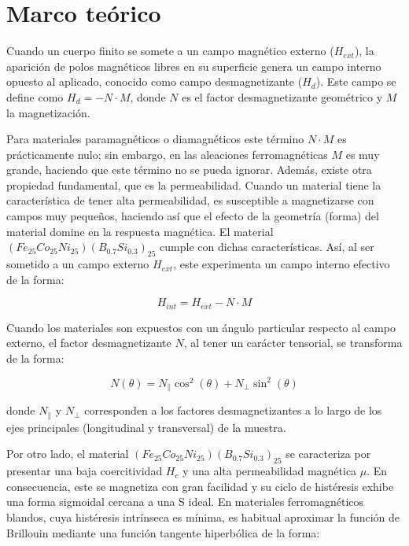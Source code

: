 


\section{Marco teórico}

Cuando un cuerpo finito se somete a un campo magnético externo ($H_{ext}$), la aparición de polos magnéticos libres en su superficie genera un campo interno opuesto al aplicado, conocido como campo desmagnetizante ($H_d$). Este campo se define como $H_d = -N \cdot M$, donde $N$ es el factor desmagnetizante geométrico y $M$ la magnetización.

Para materiales paramagnéticos o diamagnéticos este término $N \cdot M$ es prácticamente nulo; sin embargo, en las aleaciones ferromagnéticas $M$ es muy grande, haciendo que este término no se pueda ignorar. Además, existe otra propiedad fundamental, que es la permeabilidad. Cuando un material tiene la característica de tener alta permeabilidad, es susceptible a magnetizarse con campos muy pequeños, haciendo así que el efecto de la geometría (forma) del material domine en la respuesta magnética. El material $(Fe_{25}Co_{25}Ni_{25})(B_{0.7}Si_{0.3})_{25}$ cumple con dichas características. Así, al ser sometido a un campo externo $H_{ext}$, este experimenta un campo interno efectivo de la forma:

$$ H_{int} = H_{ext} - N \cdot M $$

Cuando los materiales son expuestos con un ángulo particular respecto al campo externo, el factor desmagnetizante $N$, al tener un carácter tensorial, se transforma de la forma:

$$ N(\theta) = N_{\parallel} \cos^2(\theta) + N_{\perp} \sin^2(\theta) $$

donde $N_{\parallel}$ y $N_{\perp}$ corresponden a los factores desmagnetizantes a lo largo de los ejes principales (longitudinal y transversal) de la muestra.

Por otro lado, el material $(Fe_{25}Co_{25}Ni_{25})(B_{0.7}Si_{0.3})_{25}$ se caracteriza por presentar una baja coercitividad $H_c$ y una alta permeabilidad magnética $\mu$. En consecuencia, este se magnetiza con gran facilidad y su ciclo de histéresis exhibe una forma sigmoidal cercana a una S ideal. En materiales ferromagnéticos blandos, cuya histéresis intrínseca es mínima, es habitual aproximar la función de Brillouin mediante una función tangente hiperbólica de la forma:

